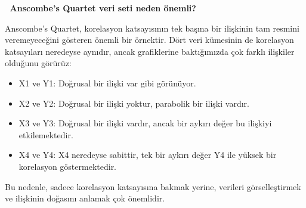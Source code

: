 \documentclass[
  letterpaper,
  DIV=11,
  numbers=noendperiod]{scrartcl}
\begin{document}
\begin{tcolorbox}[enhanced jigsaw, bottomrule=.15mm, opacitybacktitle=0.6, rightrule=.15mm, left=2mm, toprule=.15mm, leftrule=.75mm, titlerule=0mm, colframe=quarto-callout-note-color-frame, opacityback=0, arc=.35mm, colbacktitle=quarto-callout-note-color!10!white, title=\textcolor{quarto-callout-note-color}{\faInfo}\hspace{0.5em}{Not}, coltitle=black, breakable, bottomtitle=1mm, toptitle=1mm, colback=white]

👋 \textbf{Anscombe's Quartet veri seti neden önemli?}

Anscombe's Quartet, korelasyon katsayısının tek başına bir ilişkinin tam
resmini veremeyeceğini gösteren önemli bir örnektir. Dört veri kümesinin
de korelasyon katsayıları neredeyse aynıdır, ancak grafiklerine
baktığımızda çok farklı ilişkiler olduğunu görürüz:

\begin{itemize}
\item
  X1 ve Y1: Doğrusal bir ilişki var gibi görünüyor.
\item
  X2 ve Y2: Doğrusal bir ilişki yoktur, parabolik bir ilişki vardır.
\item
  X3 ve Y3: Doğrusal bir ilişki vardır, ancak bir aykırı değer bu
  ilişkiyi etkilemektedir.
\item
  X4 ve Y4: X4 neredeyse sabittir, tek bir aykırı değer Y4 ile yüksek
  bir korelasyon göstermektedir.
\end{itemize}

Bu nedenle, sadece korelasyon katsayısına bakmak yerine, verileri
görselleştirmek ve ilişkinin doğasını anlamak çok önemlidir.

\end{tcolorbox}
\end{document}

